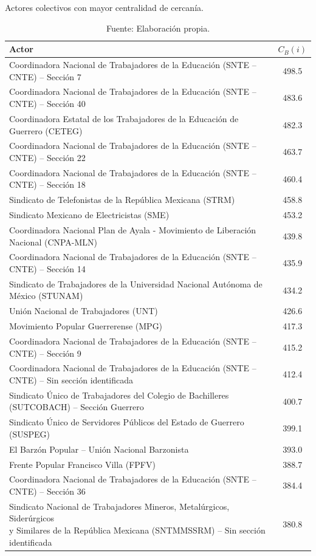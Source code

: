 \documentclass[letterpaper, 11pt]{book}
\theoremstyle{definition}
\theoremstyle{remark}
\begin{document}
\begin{table}[!hbt]
\center
\scriptsize
\caption{Actores colectivos con mayor centralidad de cercanía.}
\label{Actores_con_mayor_CC}
\begin{tabular}{ | l | c | } 
\hline
\hspace{19em} \textbf{Actor} & \textbf{$C_{B}(i)$}\\
\hline
Coordinadora Nacional de Trabajadores de la Educación (SNTE – CNTE) – Sección 7 & 498.5\\ \hline
Coordinadora Nacional de Trabajadores de la Educación (SNTE – CNTE) – Sección 40 & 483.6\\ \hline
Coordinadora Estatal de los Trabajadores de la Educación de Guerrero (CETEG) & 482.3\\ \hline
Coordinadora Nacional de Trabajadores de la Educación (SNTE – CNTE) – Sección 22 & 463.7\\ \hline
Coordinadora Nacional de Trabajadores de la Educación (SNTE – CNTE) – Sección 18 & 460.4\\ \hline
Sindicato de Telefonistas de la República Mexicana (STRM) & 458.8\\ \hline
Sindicato Mexicano de Electricistas (SME) & 453.2\\ \hline
Coordinadora Nacional Plan de Ayala - Movimiento de Liberación Nacional (CNPA-MLN) & 439.8\\ \hline
Coordinadora Nacional de Trabajadores de la Educación (SNTE – CNTE) – Sección 14 & 435.9\\ \hline
Sindicato de Trabajadores de la Universidad Nacional Autónoma de México (STUNAM) & 434.2\\ \hline
Unión Nacional de Trabajadores (UNT) & 426.6\\ \hline
Movimiento Popular Guerrerense (MPG) & 417.3\\ \hline
Coordinadora Nacional de Trabajadores de la Educación (SNTE – CNTE) – Sección 9 & 415.2\\ \hline
Coordinadora Nacional de Trabajadores de la Educación (SNTE – CNTE) – Sin sección identificada & 412.4\\ \hline
Sindicato Único de Trabajadores del Colegio de Bachilleres (SUTCOBACH) – Sección Guerrero & 400.7\\ \hline
Sindicato Único de Servidores Públicos del Estado de Guerrero (SUSPEG) & 399.1\\ \hline
El Barzón Popular – Unión Nacional Barzonista & 393.0\\ \hline
Frente Popular Francisco Villa (FPFV) & 388.7\\ \hline
Coordinadora Nacional de Trabajadores de la Educación (SNTE – CNTE) – Sección 36 & 384.4\\ \hline
\makecell[l]{Sindicato Nacional de Trabajadores Mineros, Metalúrgicos, Siderúrgicos \\y Similares de la República Mexicana (SNTMMSSRM) – Sin sección identificada} & 380.8\\ \hline
\end{tabular}
\par\bigskip
\caption*{\small Fuente: Elaboración propia.}
\end{table}
\end{document}
